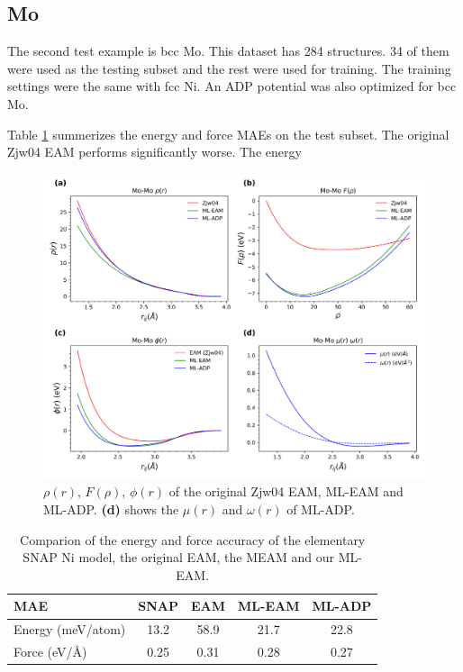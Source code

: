 \documentclass[prb,reprint]{revtex4-2}
\begin{document}
% 
%
\subsection{Mo}
\label{sec:elementary_Mo}

The second test example is bcc Mo. This dataset has 284 structures. 34 of 
them were used as the testing subset and the rest were used for training. 
The training settings were the same with fcc Ni. An ADP potential was also 
optimized for bcc Mo.

Table \ref{table:elementary_Mo_mae} summerizes the energy and force MAEs on the 
test subset. The original Zjw04 EAM performs significantly worse. The energy 

% 
%
\begin{figure}[htp]
\centering
\includegraphics[scale=0.6]{figures/Mo_eam_adp.png}
\caption{\label{fig:Mo_eam_adp} $\rho(r)$, $F(\rho)$, $\phi(r)$ of the original 
Zjw04 EAM, ML-EAM and ML-ADP. \textbf{(d)} shows the $\mu(r)$ and $\omega(r)$ of 
ML-ADP.}
\end{figure}

% 
%
\begin{table}[h]
\centering
\begin{tabular}{lcccc}
\hline
 MAE   & SNAP & EAM & ML-EAM & ML-ADP \\
\hline
Energy (meV/atom) & 13.2 & 58.9 & 21.7 & 22.8 \\
Force (eV/\AA) & 0.25 & 0.31 & 0.28 & 0.27 \\
\hline
\end{tabular}
\caption{\label{table:elementary_Mo_mae} Comparion of the energy and force 
accuracy of the elementary SNAP Ni model, the original EAM, the MEAM and our 
ML-EAM.
}
\end{table}    
\end{document}
